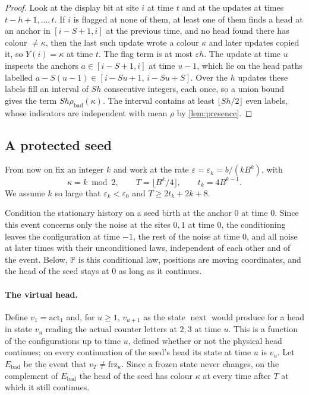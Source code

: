 \documentclass[11pt]{article}
\theoremstyle{plain}
\theoremstyle{definition}
\theoremstyle{remark}
\newcommand{\Prob}{\mathbb P}
\newcommand{\eps}{\varepsilon}
\newcommand{\act}{\mathrm{act}}
\newcommand{\frz}{\mathrm{frz}}
\newcommand{\nxt}{\operatorname{next}}
\begin{document}
\begin{proof}
Look at the display bit at site $i$ at time $t$ and at the updates at times $t-h+1,\dots,t$. If $i$ is flagged at none of them, at least one of them finds a head at an anchor in $[i-S+1,i]$ at the previous time, and no head found there has colour $\ne\kappa$, then the last such update wrote a colour $\kappa$ and later updates copied it, so $Y(i)=\kappa$ at time $t$. The flag term is at most $\eps h$. The update at time $u$ inspects the anchors $a\in[i-S+1,i]$ at time $u-1$, which lie on the head paths labelled $a-S(u-1)\in[i-Su+1,\,i-Su+S]$. Over the $h$ updates these labels fill an interval of $Sh$ consecutive integers, each once, so a union bound gives the term $Sh\rho_{\mathrm{bad}}(\kappa)$. The interval contains at least $\lfloor Sh/2\rfloor$ even labels, whose indicators are independent with mean $\rho$ by \cref{lem:presence}.
\end{proof}

\subsection{A protected seed}

From now on fix an integer $k$ and work at the rate $\eps=\eps_k=b/(kB^k)$, with
\[
\kappa=k\bmod2,\qquad T=\lfloor B^k/4\rfloor,\qquad t_k=4B^{k-1}.
\]
We assume $k$ so large that $\eps_k<\eps_0$ and $T\ge2t_k+2k+8$.

Condition the stationary history on a seed birth at the anchor $0$ at time $0$. Since this event concerns only the noise at the sites $0,1$ at time $0$, the conditioning leaves the configuration at time $-1$, the rest of the noise at time $0$, and all noise at later times with their unconditioned laws, independent of each other and of the event. Below, $\Prob$ is this conditional law, positions are moving coordinates, and the head of the seed stays at $0$ as long as it continues.

\paragraph{The virtual head.} Define $v_1=\act_1$ and, for $u\ge1$, $v_{u+1}$ as the state $\nxt$ would produce for a head in state $v_u$ reading the actual counter letters at $2,3$ at time $u$. This is a function of the configurations up to time $u$, defined whether or not the physical head continues; on every continuation of the seed's head its state at time $u$ is $v_u$. Let $E_{\mathrm{bad}}$ be the event that $v_T\ne\frz_\kappa$. Since a frozen state never changes, on the complement of $E_{\mathrm{bad}}$ the head of the seed has colour $\kappa$ at every time after $T$ at which it still continues.
\end{document}
